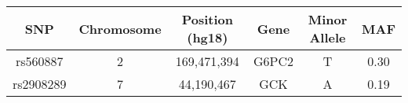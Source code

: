 \begin{table}[ht]
\centering
{\tiny
\begin{tabular}{cccccc}
  \hline
SNP & Chromosome & Position (hg18) & Gene & Minor Allele & MAF \\ 
  \hline
rs560887 &   2 & 169,471,394 & G6PC2 & T & 0.30 \\ 
  rs2908289 &   7 &  44,190,467 & GCK & A & 0.19 \\ 
   \hline
\end{tabular}
}
\end{table}
